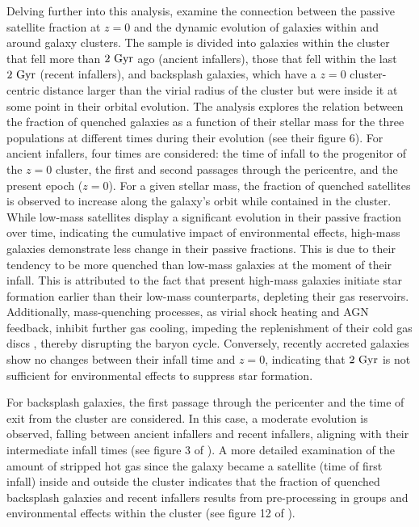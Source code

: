 \documentclass[baaa]{baaa}
\begin{document}
Delving further into this analysis, \cite{Hough_2023} examine the connection between the passive satellite fraction at $z=0$ and the dynamic evolution of galaxies within and around galaxy clusters. The sample is divided into galaxies within the cluster that fell more than $2~{\rm Gyr}$ ago (ancient infallers), those that fell within the last $2~{\rm Gyr}$ (recent infallers), and backsplash galaxies, which have a $z=0$ cluster-centric distance larger than the virial radius of the cluster but were inside it at some point in their orbital evolution. The analysis explores the relation between the fraction of quenched galaxies as a function of their stellar mass for the three populations at different times during their evolution (see their figure 6). For ancient infallers, four times are considered: the time of infall to the progenitor of the $z=0$ cluster, the first and second passages through the pericentre, and the present epoch ($z=0$). For a given stellar mass, the fraction of quenched satellites is observed to increase along the galaxy's orbit while contained in the cluster. While low-mass satellites display a significant evolution in their passive fraction over time, indicating the cumulative impact of environmental effects, high-mass galaxies demonstrate less change in their passive fractions. This is due to their tendency to be more quenched than low-mass galaxies at the moment of their infall. This is attributed to the fact that present high-mass galaxies initiate star formation earlier than their low-mass counterparts, depleting their gas reservoirs. Additionally, mass-quenching processes, as virial shock heating and AGN feedback, inhibit further gas cooling, impeding the replenishment of their cold gas discs \citep{Cora_2019}, thereby disrupting the baryon cycle.
Conversely, recently accreted galaxies show no changes between their infall time and $z=0$, indicating that $2~{\rm Gyr}$ is not sufficient for environmental effects to suppress star formation.

For backsplash galaxies, the first passage through the pericenter and the time of exit from the cluster are considered. In this case, a moderate evolution is observed, falling between ancient infallers and recent infallers, aligning with their intermediate infall times (see figure 3 of \citealt{Hough_2023}). A more detailed examination of the amount of stripped hot gas since the galaxy became a satellite (time of first infall) inside and outside the cluster indicates that the fraction of quenched backsplash galaxies and recent infallers results from pre-processing in groups and environmental effects within the cluster (see figure 12 of \citealt{Hough_2023}).
\end{document}

